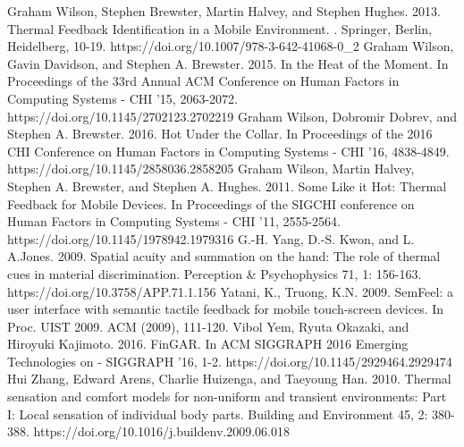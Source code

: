 \documentclass[preprint,12pt]{elsarticle}
\begin{document}
\begin{thebibliography}{00}
Graham Wilson, Stephen Brewster, Martin Halvey, and Stephen Hughes. 2013. Thermal Feedback Identification in a Mobile Environment. . Springer, Berlin, Heidelberg, 10-19. https://doi.org/10.1007/978-3-642-41068-0\_2
Graham Wilson, Gavin Davidson, and Stephen A. Brewster. 2015. In the Heat of the Moment. In Proceedings of the 33rd Annual ACM Conference on Human Factors in Computing Systems - CHI '15, 2063-2072. https://doi.org/10.1145/2702123.2702219
Graham Wilson, Dobromir Dobrev, and Stephen A. Brewster. 2016. Hot Under the Collar. In Proceedings of the 2016 CHI Conference on Human Factors in Computing Systems - CHI '16, 4838-4849. https://doi.org/10.1145/2858036.2858205
Graham Wilson, Martin Halvey, Stephen A. Brewster, and Stephen A. Hughes. 2011. Some Like it Hot: Thermal Feedback for Mobile Devices. In Proceedings of the SIGCHI conference on Human Factors in Computing Systems - CHI '11, 2555-2564. https://doi.org/10.1145/1978942.1979316
G.-H. Yang, D.-S. Kwon, and L. A.Jones. 2009. Spatial acuity and summation on the hand: The role of thermal cues in material discrimination. Perception \& Psychophysics 71, 1: 156-163. https://doi.org/10.3758/APP.71.1.156
Yatani, K., Truong, K.N. 2009. SemFeel: a user interface with semantic tactile feedback for mobile touch-screen devices. In Proc. UIST 2009. ACM (2009), 111-120.
Vibol Yem, Ryuta Okazaki, and Hiroyuki Kajimoto. 2016. FinGAR. In ACM SIGGRAPH 2016 Emerging Technologies on - SIGGRAPH '16, 1-2. https://doi.org/10.1145/2929464.2929474
Hui Zhang, Edward Arens, Charlie Huizenga, and Taeyoung Han. 2010. Thermal sensation and comfort models for non-uniform and transient environments: Part I: Local sensation of individual body parts. Building and Environment 45, 2: 380-388. https://doi.org/10.1016/j.buildenv.2009.06.018


\end{thebibliography}
\end{document}
